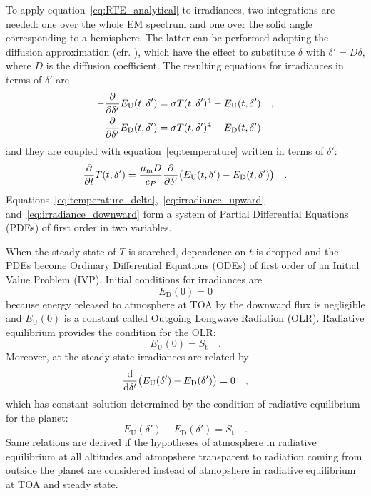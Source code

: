 \documentclass[a4paper,10pt,twocolumn,\classoptions]{article}
\begin{document}
To apply equation~\eqref{eq:RTE_analytical} to irradiances, two integrations are needed: one over the whole EM spectrum and one over the solid angle corresponding to a hemisphere. The latter can be performed adopting the diffusion approximation (cfr. \cite[55]{Catling}), which have the effect to substitute $\delta$ with $\delta' = D \delta$, where $D$ is the diffusion coefficient.
The resulting equations for irradiances in terms of $\delta'$ are
\begin{align}
  \label{eq:irradiance_upward}
  - \pdv*{E_\text{U}(t, \delta')}{\delta'} & = \sigma T(t, \delta')^4 - E_\text{U}(t, \delta') \quad , \\
  \label{eq:irradiance_downward}
  \pdv*{E_\text{D}(t, \delta')}{\delta'} & = \sigma T(t, \delta')^4 - E_\text{D}(t, \delta')
\end{align}
and they are coupled with equation~\eqref{eq:temperature} written in terms of $\delta'$:
\begin{equation}
  \label{eq:temperature_delta}
  \pdv*{T(t, \delta')}{t} = \frac{\mu_\text{m} D}{c_P} \pdv*{\big( E_\text{U}(t, \delta') - E_\text{D}(t, \delta') \big)}{\delta'}
  \quad .
\end{equation}
Equations~\eqref{eq:temperature_delta},~\eqref{eq:irradiance_upward} and~\eqref{eq:irradiance_downward} form a system of Partial Differential Equations (PDEs) of first order in two variables.

When the steady state of $T$ is searched, dependence on $t$ is dropped and the PDEs become Ordinary Differential Equations (ODEs) of first order of an Initial Value Problem (IVP).
Initial conditions for irradiances are
\begin{equation}
  \label{eq:initial_downward}
  E_\text{D}(0) = 0
\end{equation}
because energy released to atmosphere at TOA by the downward flux is negligible and $E_\text{U}(0)$ is a constant called Outgoing Longwave Radiation (OLR).
Radiative equilibrium provides the condition for the OLR:
\begin{equation}
  \label{eq:initial_upward}
  E_\text{U}(0) = S_\text{t}
  \quad .
\end{equation}
Moreover, at the steady state irradiances are related by
\begin{equation}
  \label{eq:irradiance_steady_state}
  \odv*{\big( E_\text{U}(\delta') - E_\text{D}(\delta') \big)}{\delta'} = 0
  \quad ,
\end{equation}
which has constant solution determined by the condition of radiative equilibrium for the planet:
\begin{equation}
  \label{eq:irradiance_steady_state_solution}
  E_\text{U}(\delta') - E_\text{D}(\delta') = S_\text{t}
  \quad .
\end{equation}
Same relations are derived if the hypotheses of atmosphere in radiative equilibrium at all altitudes and atmopshere transparent to radiation coming from outside the planet are considered instead of atmopshere in radiative equilibrium at TOA and steady state.
\end{document}
